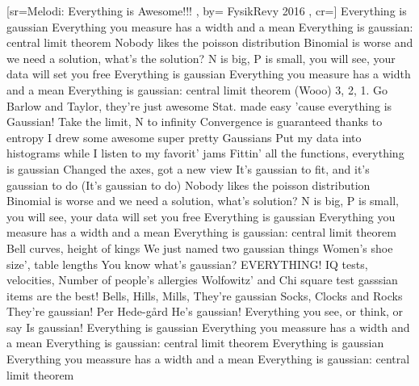 \documentclass[pdftex,12pt]{article}
\begin{document}
\begin{songs}{}
[sr={Melodi: Everything is Awesome!!!}
,
by={ FysikRevy 2016}
,
cr={}]\hypertarget{Everything is Gaussian}{}
\label{song87}
\beginverse
		Everything is gaussian
		Everything you measure has a width and a mean
		Everything is gaussian: central limit theorem
\endverse
\beginverse	
		Nobody likes the poisson distribution
		Binomial is worse and we need a solution, what's the solution?
		N is big, P is small, you will see, your data will set you free
\endverse
\beginverse	
		Everything is gaussian
		Everything you measure has a width and a mean
		Everything is gaussian: central limit theorem
\endverse
\beginverse	
		(Wooo)
		3, 2, 1. Go
\endverse
\beginverse	
		Barlow and Taylor, they're just awesome
		Stat. made easy 'cause everything is Gaussian!
		Take the limit, N to infinity
		Convergence is guaranteed thanks to entropy
\endverse
\beginverse	
		I drew some awesome super pretty Gaussians
		Put my data into histograms
		while I listen to my favorit' jams
		Fittin' all the functions, everything is gaussian
		Changed the axes, got a new view
		It's gaussian to fit, and it's gaussian to do (It's gaussian to do)
\endverse
\beginverse	
		Nobody likes the poisson distribution
		Binomial is worse and we need a solution, what's solution?
		N is big, P is small, you will see, your data will set you free
\endverse
\beginverse	
		Everything is gaussian
		Everything you measure has a width and a mean
		Everything is gaussian: central limit theorem
\endverse
\beginverse	
		Bell curves, height of kings
		We just named two gaussian things
		Women's shoe size', table lengths
		You know what's gaussian? EVERYTHING!
\endverse
\beginverse	
		IQ tests, velocities,
		Number of people's allergies
		Wolfowitz' and Chi square test
		gasssian items are the best!
\endverse
\beginverse	
		Bells, Hills, Mills,
		They're gaussian
		Socks, Clocks and Rocks
		They're gaussian!
		Per Hede-gård
		He's gaussian!
		Everything you see, or think, or say
		Is gaussian!
\endverse
\beginverse	
		Everything is gaussian
		Everything you meassure has a width and a mean
		Everything is gaussian: central limit theorem
\endverse
\beginverse	
		Everything is gaussian
		Everything you meassure has a width and a mean
		Everything is gaussian: central limit theorem
\endverse
\endsong





\end{songs}
\end{document}
